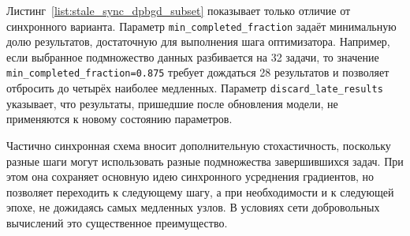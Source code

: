 \documentclass[a4paper,12pt]{extarticle}
\begin{document}
Листинг~\ref{list:stale_sync_dpbgd_subset} показывает только отличие от синхронного варианта.
Параметр \newline\texttt{min\_completed\_fraction} задаёт минимальную долю результатов, достаточную для выполнения шага оптимизатора.
Например, если выбранное подмножество данных разбивается на 32 задачи, то значение \texttt{min\_completed\_fraction=0.875} требует дождаться 28 результатов и позволяет отбросить до четырёх наиболее медленных.
Параметр \texttt{discard\_late\_results} указывает, что результаты, пришедшие после обновления модели, не применяются к новому состоянию параметров.

Частично синхронная схема вносит дополнительную стохастичность, поскольку разные шаги могут использовать разные подмножества завершившихся задач.
При этом она сохраняет основную идею синхронного усреднения градиентов, но позволяет переходить к следующему шагу, а при необходимости и к следующей эпохе, не дожидаясь самых медленных узлов.
В условиях сети добровольных вычислений это существенное преимущество.




\end{document}
